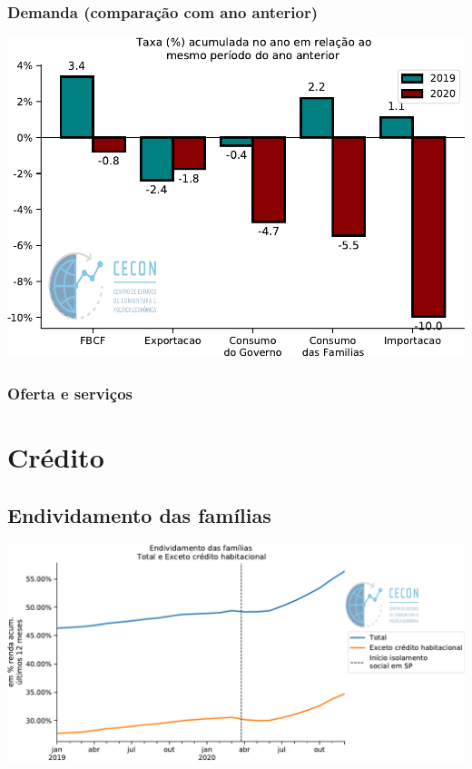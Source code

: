 \documentclass{SelfArx}
\begin{document}
\subsubsection*{Demanda (comparação com ano anterior)}
\label{sec:org1ede3ee}

\begin{center}
\includegraphics[width=.9\linewidth]{./figs/PIB/Demanda_Acum_Comparativo.pdf}
\end{center}

\subsubsection*{Oferta e serviços}
\label{sec:orgacf8d35}

\section*{Crédito}
\label{sec:org1714cf3}

\subsection*{Endividamento das famílias}
\label{sec:orgf0d5a8d}

\begin{center}
\includegraphics[width=.9\linewidth]{./figs/Credito/EndividamentoFamilias.pdf}
\end{center}
\end{document}
